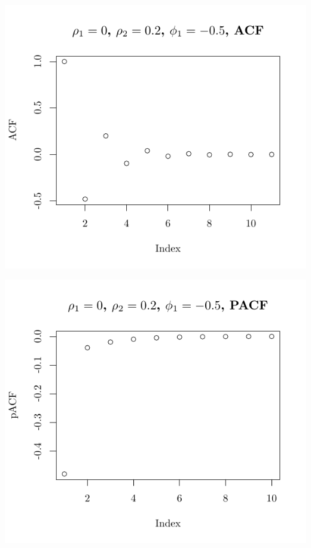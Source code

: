 \documentclass[10pt]{paper}\usepackage[]{graphicx}\usepackage[]{color}
\makeatletter
\def\maxwidth{ %
  \ifdim\Gin@nat@width>\linewidth
    \linewidth
  \else
    \Gin@nat@width
  \fi
}
\newenvironment{knitrout}{}{} %
\makeatother
\begin{document}
\begin{knitrout}
{\centering \includegraphics[width=\maxwidth]{figure/graphics-plotter-57} 

}




{\centering \includegraphics[width=\maxwidth]{figure/graphics-plotter-58} 

}





\end{knitrout}
\end{document}
